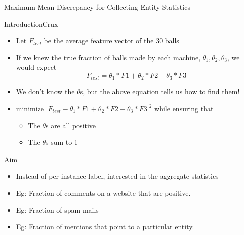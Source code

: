 \begin{frame}
\begin{center}
 
\Huge Maximum Mean Discrepancy for Collecting Entity Statistics

\end{center}

 \end{frame}
\begin{frame}{Introduction}{Crux}
 \begin{itemize}
  \item Let $F_{test}$ be the average feature vector of the 30 balls \medskip
  \item If we knew the true fraction of balls made by each machine, $\theta_1, \theta_2, \theta_3$, we would expect \medskip
  \begin{equation}
   F_{test} = \theta_1 * F1 + \theta_2 * F2 + \theta_3 * F3
  \end{equation}
\item We don't know the $\theta$s, but the above equation tells us how to find them! \medskip
\item minimize $|F_{test} - \theta_1 * F1 + \theta_2 * F2 + \theta_3 * F3|^2$ while ensuring that
\begin{itemize}
 \item The $\theta$s are all positive
 \item The $\theta$s sum to 1
\end{itemize}
 \end{itemize}
\end{frame}

\begin{frame}{Aim}
 \begin{itemize}
  \item Instead of per instance label, interested in the aggregate statistics\medskip
  \item Eg: Fraction of comments on a website that are positive.\medskip
  \item Eg: Fraction of spam mails\medskip
  \item Eg: Fraction of mentions that point to a particular entity.\medskip
 \end{itemize}
\end{frame}

